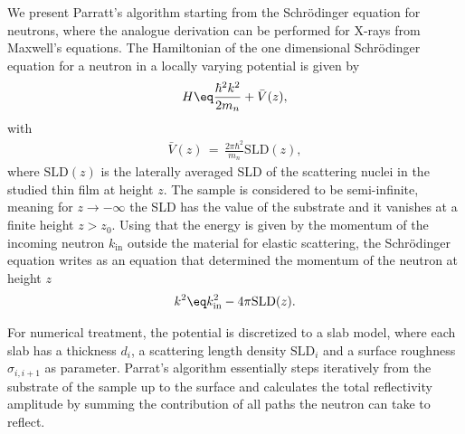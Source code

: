 \documentclass[\main/dresen_thesis.tex]{subfiles}
\begin{document}
    We present Parratt's algorithm starting from the Schr\"odinger equation for neutrons, where the analogue derivation can be performed for X-rays from Maxwell's equations.
    The Hamiltonian of the one dimensional Schr\"odinger equation for a neutron in a locally varying potential is given by
    \begin{align}
      H \eq \frac{\hbar^2 k^2}{2m_n} + \bar{V}(z),
    \end{align}
    with
    \begin{align}
      \bar{V}(z) \, = \, \frac{2 \pi \hbar^2}{m_n} \mathrm{SLD}(z),
    \end{align}
    where $\mathrm{SLD}(z)$ is the laterally averaged SLD of the scattering nuclei in the studied thin film at height $z$.
    The sample is considered to be semi-infinite, meaning for $z \rightarrow -\infty$ the SLD has the value of the substrate and it vanishes at a finite height $z > z_0$.
    Using that the energy is given by the momentum of the incoming neutron $k_\mathrm{in}$ outside the material for elastic scattering, the Schr\"odinger equation writes as an equation that determined the momentum of the neutron at height $z$
    \begin{align}
      k^2 \eq   k_\mathrm{in}^2 - 4 \pi  \mathrm{SLD}(z).
    \end{align}

    For numerical treatment, the potential is  discretized to a slab model, where each slab has a thickness $d_i$, a scattering length density $\mathrm{SLD}_i$ and a surface roughness $\sigma_{i,i+1}$ as parameter.
    Parrat's algorithm essentially steps iteratively from the substrate of the sample up to the surface and calculates the total reflectivity amplitude by summing the contribution of all paths the neutron can take to reflect.
\end{document}
